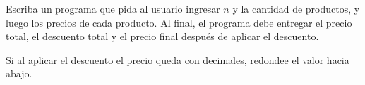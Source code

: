 \documentclass[11pt,spanish]{article}
\begin{document}
\begin{enumerate}[font=\Large\bfseries]
\begin{minipage}[t]{.55\textwidth}
        Escriba un programa que pida al usuario ingresar \(n\)
        y la cantidad de productos,
        y luego los precios de cada producto.
        Al final,
        el programa debe entregar el precio total,
        el descuento total
        y el precio final después de aplicar el descuento.
        \vspace{1ex}

        Si al aplicar el descuento el precio queda con decimales,
        redondee el valor hacia abajo.
      \end{minipage}
      \hfill
      \begin{minipage}[t]{.35\textwidth}
        
      \end{minipage}

  \end{enumerate}
\end{document}
